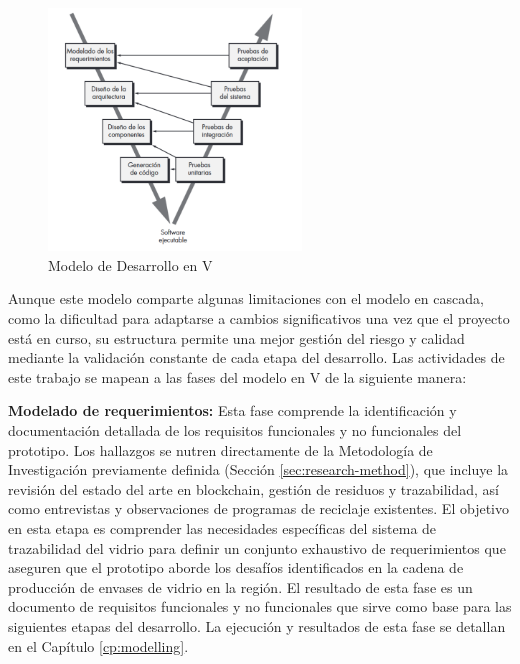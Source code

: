 \begin{figure}[!htpb]
    \centering
    \includegraphics[width=0.6\textwidth]{Figures/model-v.png}
    \caption{Modelo de Desarrollo en V \cite{pressman2010ingenieria}}
    \label{fig:methodology-v}
\end{figure}

Aunque este modelo comparte algunas limitaciones con el modelo en cascada, como la dificultad para adaptarse a cambios significativos una vez que el proyecto está en curso, su estructura permite una mejor gestión del riesgo y calidad mediante la validación constante de cada etapa del desarrollo.
Las actividades de este trabajo se mapean a las fases del modelo en V de la siguiente manera:

\textbf{Modelado de requerimientos:}
Esta fase comprende la identificación y documentación detallada de los requisitos funcionales y no funcionales del prototipo.
Los hallazgos se nutren directamente de la Metodología de Investigación previamente definida (Sección \ref{sec:research-method}), que incluye la revisión del estado del arte en blockchain, gestión de residuos y trazabilidad, así como entrevistas y observaciones de programas de reciclaje existentes.
El objetivo en esta etapa es comprender las necesidades específicas del sistema de trazabilidad del vidrio para definir un conjunto exhaustivo de requerimientos que aseguren que el prototipo aborde los desafíos identificados en la cadena de producción de envases de vidrio en la región.
El resultado de esta fase es un documento de requisitos funcionales y no funcionales que sirve como base para las siguientes etapas del desarrollo.
La ejecución y resultados de esta fase se detallan en el Capítulo \ref{cp:modelling}.

